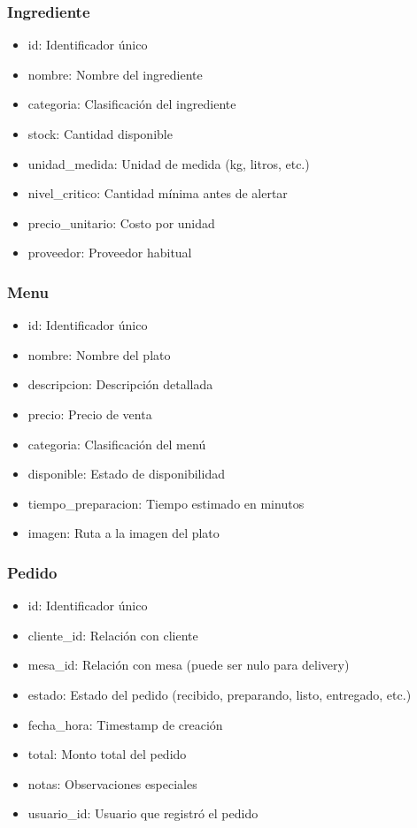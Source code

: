 \documentclass[12pt]{article}
\begin{document}
\subsubsection{Ingrediente}
\begin{itemize}
  \item id: Identificador único
  \item nombre: Nombre del ingrediente
  \item categoria: Clasificación del ingrediente
  \item stock: Cantidad disponible
  \item unidad\_medida: Unidad de medida (kg, litros, etc.)
  \item nivel\_critico: Cantidad mínima antes de alertar
  \item precio\_unitario: Costo por unidad
  \item proveedor: Proveedor habitual
\end{itemize}

\subsubsection{Menu}
\begin{itemize}
  \item id: Identificador único
  \item nombre: Nombre del plato
  \item descripcion: Descripción detallada
  \item precio: Precio de venta
  \item categoria: Clasificación del menú
  \item disponible: Estado de disponibilidad
  \item tiempo\_preparacion: Tiempo estimado en minutos
  \item imagen: Ruta a la imagen del plato
\end{itemize}

\subsubsection{Pedido}
\begin{itemize}
  \item id: Identificador único
  \item cliente\_id: Relación con cliente
  \item mesa\_id: Relación con mesa (puede ser nulo para delivery)
  \item estado: Estado del pedido (recibido, preparando, listo, entregado, etc.)
  \item fecha\_hora: Timestamp de creación
  \item total: Monto total del pedido
  \item notas: Observaciones especiales
  \item usuario\_id: Usuario que registró el pedido
\end{itemize}
\end{document}
